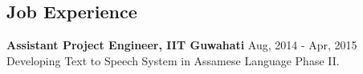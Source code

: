 \documentclass[margin, centered]{res}
\begin{document}
\begin{resume}
\section{Job Experience}
\textbf{Assistant Project Engineer, IIT Guwahati} \hfill Aug, 2014 - Apr, 2015\\
Developing Text to Speech System in Assamese Language Phase II. \\


\end{resume}
\end{document}
